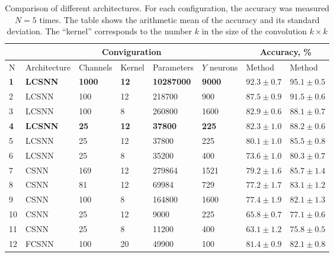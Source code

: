\documentclass[a4paper,10pt]{article}
\begin{document}
\begin{table}[H]
 \caption{Comparison of different architectures. For each configuration, the accuracy was measured $ N = 5 $ times. The table shows the arithmetic mean of the accuracy and its standard deviation. The ``kernel'' corresponds to the number $ k $ in the size of the convolution $ k \times k $}
\begin{center}
\begin{minipage*}{16cm}
\begin{tabular}{|l|l|l|l|l|l|p{2.2cm}|p{2.2cm}|}
\hline
&\multicolumn{5}{c|}{Conviguration} & \multicolumn{2}{c|}{Accuracy, \%}\\
\hline
N & Architecture & Channels & Kernel & Parameters & $Y$ neurons & {Method \footnotemark[1]} & {Method \footnotemark[2]} \\
\hline\hline
{\textbf{1}} & {\textbf{LCSNN}} & {\textbf{1000}} & {\textbf{12}} & {\textbf{10287000}} & {\textbf{9000}} & {$\mathbf{92.3 \pm 0.7}$} & {$\mathbf{95.1 \pm 0.5}$}\\
\hline
2 & {LCSNN} & {100} & {12} & {218700} & {900} & {$87.5 \pm 0.9$} & {$91.5 \pm 0.6$}\\
\hline
3 & {LCSNN} & {100} & {8} & {260800} & {1600} & {$82.9 \pm 0.6$} & {$88.1 \pm 0.7$}\\
\hline
{\textbf{4}} & {\textbf{LCSNN\footnotemark[3]}} & {\textbf{25}} & {\textbf{12}} & {\textbf{37800}} & {\textbf{225}} & {$\mathbf{82.3 \pm 1.0}$} & {$\mathbf{88.2 \pm 0.6}$}\\
\hline
5 & {LCSNN} & {25} & {12} & {37800} & {225} & {$80.1 \pm 1.0$} & {$85.5 \pm 0.8$}\\
\hline
6 & {LCSNN} & {25} & {8} & {35200} & {400} & {$73.6 \pm 1.0$} & {$80.3 \pm 0.7$}\\
\hline\hline
7 & {CSNN} & {169} & {12} & {279864} & {1521} & {$79.2 \pm 1.6$} & {$85.7 \pm 1.4$}\\
\hline
8 & {CSNN} & {81} & {12} & {69984} & {729} & {$77.2 \pm 1.7$} & {$83.1 \pm 1.2$}\\
\hline
9 & {CSNN} & {100} & {8} & {164800} & {1600} & {$77.4 \pm 1.9$} & {$82.1 \pm 1.3$}\\
\hline
10 & {CSNN} & {25} & {12} & {9000} & {225} & {$65.8 \pm 0.7$} & {$77.1 \pm 0.6$}\\
\hline
11 & {CSNN} & {25} & {8} & {11200} & {400} & {$63.1 \pm 1.2$} & {$75.8 \pm 0.5$}\\
\hline\hline
12 & {FCSNN} & {100} & {20} & {49900} & {100} & {$81.4 \pm 0.9$} & {$82.1 \pm 0.8$}\\
\hline
\end{tabular}


\end{minipage*}
\end{center}
\label{results}
\end{table}
\end{document}
